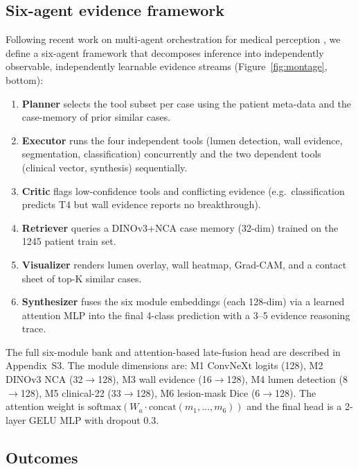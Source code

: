 \documentclass[11pt,a4paper]{article}
\begin{document}
\subsection{Six-agent evidence framework}

Following recent work on multi-agent orchestration for medical perception \cite{facadefixer2026}, we define a six-agent framework that decomposes inference into independently observable, independently learnable evidence streams (Figure~\ref{fig:montage}, bottom):
\begin{enumerate}[leftmargin=*]
\item \textbf{Planner} selects the tool subset per case using the patient meta-data and the case-memory of prior similar cases.
\item \textbf{Executor} runs the four independent tools (lumen detection, wall evidence, segmentation, classification) concurrently and the two dependent tools (clinical vector, synthesis) sequentially.
\item \textbf{Critic} flags low-confidence tools and conflicting evidence (e.g.\ classification predicts T4 but wall evidence reports no breakthrough).
\item \textbf{Retriever} queries a DINOv3+NCA case memory (32-dim) trained on the 1245 patient train set.
\item \textbf{Visualizer} renders lumen overlay, wall heatmap, Grad-CAM, and a contact sheet of top-K similar cases.
\item \textbf{Synthesizer} fuses the six module embeddings (each 128-dim) via a learned attention MLP into the final 4-class prediction with a 3--5 evidence reasoning trace.
\end{enumerate}

The full six-module bank and attention-based late-fusion head are described in Appendix~S3. The module dimensions are: M1 ConvNeXt logits (128), M2 DINOv3 NCA (32$\to$128), M3 wall evidence (16$\to$128), M4 lumen detection (8$\to$128), M5 clinical-22 (33$\to$128), M6 lesion-mask Dice (6$\to$128). The attention weight is $\mathrm{softmax}(W_a \cdot \mathrm{concat}(m_1,\ldots,m_6))$ and the final head is a 2-layer GELU MLP with dropout 0.3.

\subsection{Outcomes}
\end{document}
